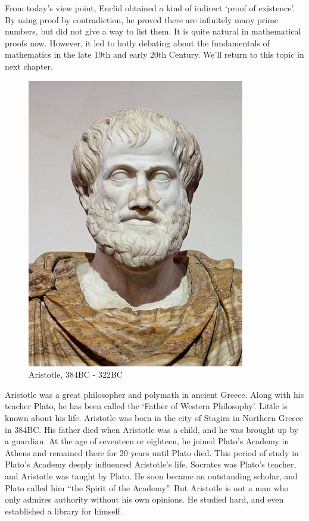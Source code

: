 \documentclass{article}
\begin{document}
From today's view point, Euclid obtained a kind of indirect `proof of existence'. By using proof by contradiction, he proved there are infinitely many prime numbers, but did not give a way to list them. It is quite natural in mathematical proofs now. However, it led to hotly debating about the fundamentals of mathematics in the late 19th and early 20th Century. We'll return to this topic in next chapter.

\begin{figure}[htbp]
 \centering
 \includegraphics[scale=1]{img/Aristotle.jpg}
 \captionsetup{labelformat=empty}
 \caption{Aristotle, 384BC - 322BC}
 \label{fig:Aristotle}
\end{figure}

Aristotle was a great philosopher and polymath in ancient Greece. Along with his teacher Plato, he has been called the `Father of Western Philosophy'. Little is known about his life. Aristotle was born in the city of Stagira in Northern Greece in 384BC. His father died when Aristotle was a child, and he was brought up by a guardian. At the age of seventeen or eighteen, he joined Plato's Academy in Athens and remained there for 20 years until Plato died. This period of study in Plato's Academy deeply influenced Aristotle's life. Socrates was Plato's teacher, and Aristotle was taught by Plato. He soon became an outstanding scholar, and Plato called him ``the Spirit of the Academy''. But Aristotle is not a man who only admires authority without his own opinions. He studied hard, and even established a library for himself.
\end{document}
